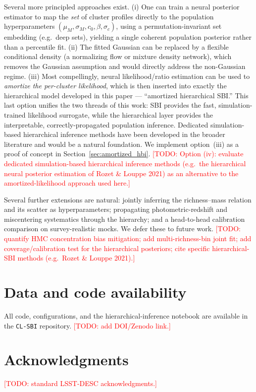 \documentclass[11pt]{article}
\newcommand{\code}[1]{\texttt{#1}}
\newcommand{\todo}[1]{\textcolor{red}{[TODO: #1]}}
\begin{document}
Several more principled approaches exist. (i) One can train a neural posterior estimator to map the
\emph{set} of cluster profiles directly to the population hyperparameters $(\mu_M, \sigma_M, c_0,
\beta, \sigma_c)$, using a permutation-invariant set embedding (e.g.\ deep sets), yielding a single
coherent population posterior rather than a percentile fit. (ii) The fitted Gaussian can be
replaced by a flexible conditional density (a normalizing flow or mixture density network), which
removes the Gaussian assumption and would directly address the non-Gaussian regime. (iii) Most
compellingly, neural likelihood/ratio estimation can be used to \emph{amortize the per-cluster
likelihood}, which is then inserted into exactly the hierarchical model developed in this paper ---
``amortized hierarchical SBI.'' This last option unifies the two threads of this work: SBI provides
the fast, simulation-trained likelihood surrogate, while the hierarchical layer provides the
interpretable, correctly-propagated population inference. Dedicated simulation-based hierarchical
inference methods have been developed in the broader literature and would be a natural foundation.
We implement option~(iii) as a proof of concept in Section~\ref{sec:amortized_hbi}.
\todo{Option (iv): evaluate dedicated simulation-based hierarchical inference methods (e.g.\ the
hierarchical neural posterior estimation of Rozet \& Louppe 2021) as an alternative to the
amortized-likelihood approach used here.}

Several further extensions are natural: jointly inferring the richness--mass relation and its
scatter as hyperparameters; propagating photometric-redshift and miscentering systematics through
the hierarchy; and a head-to-head calibration comparison on survey-realistic mocks. We defer these
to future work. \todo{quantify HMC concentration bias mitigation; add multi-richness-bin joint fit;
add coverage/calibration test for the hierarchical posteriors; cite specific hierarchical-SBI
methods (e.g.\ Rozet \& Louppe 2021).}

\section*{Data and code availability}
All code, configurations, and the hierarchical-inference notebook are available in the
\code{CL-SBI} repository. \todo{add DOI/Zenodo link.}

\section*{Acknowledgments}
\todo{standard LSST-DESC acknowledgments.}



\end{document}
